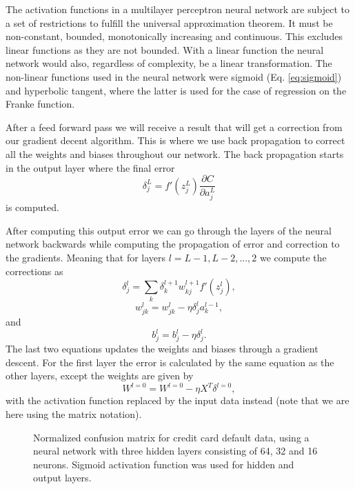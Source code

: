 \documentclass[%
 reprint,
nofootinbib,
 amsmath,amssymb,
 aps,
]{revtex4-2}
\begin{document}
The activation functions in a multilayer perceptron neural network are subject to a set of restrictions to fulfill the universal approximation theorem. It must be non-constant, bounded, monotonically increasing  and continuous. This excludes linear functions as they are not bounded. With a linear function the neural network would also, regardless of complexity, be a linear transformation. The non-linear functions used in the neural network were sigmoid (Eq. \eqref{eq:sigmoid}) and hyperbolic tangent, where the latter is used for the case of regression on the Franke function.

After a feed forward pass we will receive a result that will get a correction from our gradient decent algorithm. This is where we use back propagation to correct all the weights and biases throughout our network. The back propagation starts in the output layer where the final error
%
\begin{equation}\label{eq:output_error}
    \delta_j^L = f'(z_j^L) \frac{\partial C}{\partial a_j^L}
\end{equation}
%
is computed.

After computing this output error we can go through the layers of the neural network backwards while computing the propagation of error and correction to the gradients. Meaning that for layers $l = L-1,L-2,...,2$ we compute the corrections as
%
\begin{equation}
    \delta_j^l = \sum_k \delta_k^{l+1} w_{kj}^{l+1} f'(z_{j}^{l}) ,
\end{equation}
%
\begin{equation}
    w_{jk}^l = w_{jk}^l - \eta \delta_j^l a_k^{l-1},
\end{equation}
%
and
%
\begin{equation}
    b_j^l = b_{j}^l - \eta \delta_j^l .
\end{equation}
%
The last two equations updates the weights and biases through a gradient descent. For the first layer the error is calculated by the same equation as the other layers, except the weights are given by
%
\begin{equation}
    W^{l=0} = W^{l=0} - \eta X^T \delta^{l=0},
\end{equation}
%
with the activation function replaced by the input data instead (note that we are here using the matrix notation).

\begin{figure}[h!]
\caption{Normalized confusion matrix for credit card default data, using a neural network with three hidden layers consisting of 64, 32 and 16 neurons. Sigmoid activation function was used for hidden and output layers. }
\label{fig:conf_matrices_NN}
\end{figure}
\end{document}
